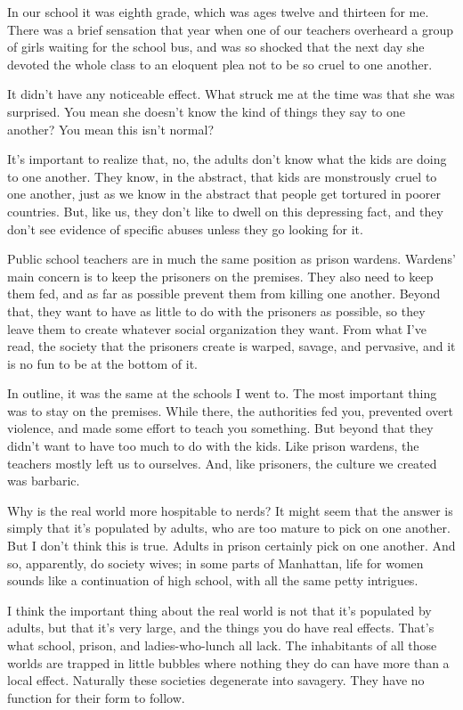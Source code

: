 In our school it was eighth grade, which was ages twelve and thirteen
for me. There was a brief sensation that year when one of our teachers
overheard a group of girls waiting for the school bus, and was so
shocked that the next day she devoted the whole class to an eloquent
plea not to be so cruel to one another.

It didn't have any noticeable effect. What struck me at the time was
that she was surprised. You mean she doesn't know the kind of things
they say to one another? You mean this isn't normal?

It's important to realize that, no, the adults don't know what the kids
are doing to one another. They know, in the abstract, that kids are
monstrously cruel to one another, just as we know in the abstract that
people get tortured in poorer countries. But, like us, they don't like
to dwell on this depressing fact, and they don't see evidence of
specific abuses unless they go looking for it.

Public school teachers are in much the same position as prison wardens.
Wardens' main concern is to keep the prisoners on the premises. They
also need to keep them fed, and as far as possible prevent them from
killing one another. Beyond that, they want to have as little to do with
the prisoners as possible, so they leave them to create whatever social
organization they want. From what I've read, the society that the
prisoners create is warped, savage, and pervasive, and it is no fun to
be at the bottom of it.

In outline, it was the same at the schools I went to. The most important
thing was to stay on the premises. While there, the authorities fed you,
prevented overt violence, and made some effort to teach you something.
But beyond that they didn't want to have too much to do with the kids.
Like prison wardens, the teachers mostly left us to ourselves. And, like
prisoners, the culture we created was barbaric.

Why is the real world more hospitable to nerds? It might seem that the
answer is simply that it's populated by adults, who are too mature to
pick on one another. But I don't think this is true. Adults in prison
certainly pick on one another. And so, apparently, do society wives; in
some parts of Manhattan, life for women sounds like a continuation of
high school, with all the same petty intrigues.

I think the important thing about the real world is not that it's
populated by adults, but that it's very large, and the things you do
have real effects. That's what school, prison, and ladies-who-lunch all
lack. The inhabitants of all those worlds are trapped in little bubbles
where nothing they do can have more than a local effect. Naturally these
societies degenerate into savagery. They have no function for their form
to follow.

